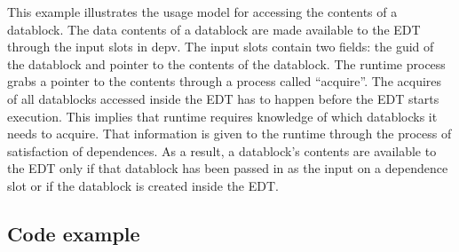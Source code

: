 This example illustrates the usage model for accessing the contents of a datablock.
The data contents of a datablock are made available to the EDT through the input slots in depv.
The input slots contain two fields: the guid of the datablock and pointer to the contents of the datablock.
The runtime process grabs a pointer to the contents through a process called ``acquire''.
The acquires of all datablocks accessed inside the EDT has to happen
before the EDT starts execution. This implies that runtime requires knowledge of
which datablocks it needs to acquire. That information is given to the runtime through
the process of satisfaction of dependences. As a result, a datablock's contents are available
to the EDT only if that datablock has been passed in as the input on a dependence slot or
if the datablock is created inside the EDT.
\subsection{Code example}
